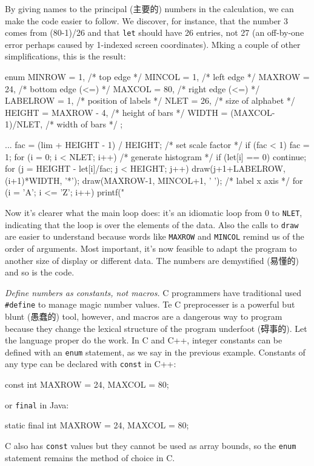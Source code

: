 By giving names to the principal (主要的) numbers in the calculation, we
can make the code easier to follow. We discover, for instance, that the
number 3 comes from (80-1)/26 and that \verb'let' should have 26 entries,
not 27 (an off-by-one error perhaps caused by 1-indexed screen
coordinates). Mking a couple of other simplifications, this is the result:
\begin{wellcode}
    enum {
        MINROW  = 1,                        /* top edge */
        MINCOL  = 1,                        /* left edge */
        MAXROW  = 24,                       /* bottom edge (<=) */
        MAXCOL  = 80,                       /* right edge (<=) */
        LABELROW = 1,                       /* position of labels */
        NLET    = 26,                       /* size of alphabet */
        HEIGHT  = MAXROW - 4,               /* height of bars */
        WIDTH   = (MAXCOL-1)/NLET,          /* width of bars */
    };

    ...
    fac = (lim + HEIGHT - 1) / HEIGHT;  /* set scale factor */
    if (fac < 1)
        fac = 1;
    for (i = 0; i < NLET; i++) { /* generate histogram */
        if (let[i] == 0)
            continue;
        for (j = HEIGHT - let[i]/fac; j < HEIGHT; j++)
            draw(j+1+LABELROW, (i+1)*WIDTH, '*');
    }
    draw(MAXROW-1, MINCOL+1, ' '); /* label x axis */
    for (i = 'A'; i <= 'Z'; i++)
        printf("%
\end{wellcode}
Now it's clearer what the main loop does: it's an idiomatic loop from 0 to
\verb'NLET', indicating that the loop is over the elements of the data.
Also the calls to \verb'draw' are easier to understand because words like
\verb'MAXROW' and \verb'MINCOL' remind us of the order of arguments. Most
important, it's now feasible to adapt the program to another size of
display or different data. The numbers are demystified (易懂的) and so is
the code.

\emph{Define numbers as constants, not macros.} C programmers have
traditional used \verb'#define' to manage magic number values. Te C
preprocesser is a powerful but blunt (愚蠢的) tool, however, and macros are
a dangerous way to program because they change the lexical structure of the
program underfoot (碍事的). Let the language proper do the work. In C and
C++, integer constants can be defined with an \verb'enum' statement, as we
say in the previous example. Constants of any type can be declared with
\verb'const' in C++:
\begin{wellcode}
    const int MAXROW = 24, MAXCOL = 80;
\end{wellcode}
or \verb'final' in Java:
\begin{wellcode}
    static final int MAXROW = 24, MAXCOL = 80;
\end{wellcode}
C also has \verb'const' values but they cannot be used as array bounds, so
the \verb'enum' statement remains the method of choice in C.

